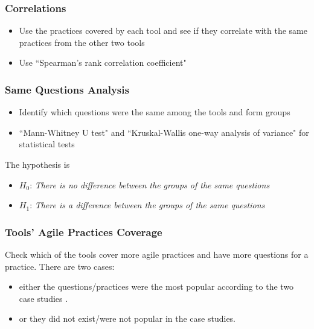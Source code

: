 \clearpage

%

\subsubsection{Correlations}

\begin{itemize}
	\item Use the practices covered by each tool and see if they correlate with the same practices from the other two tools
	\item Use ``Spearman's rank correlation coefficient"
\end{itemize}

\clearpage

\subsubsection{Same Questions Analysis}

\begin{itemize}
	\item Identify which questions were the same among the tools and form groups
	\item ``Mann-Whitney U test" and ``Kruskal-Wallis one-way analysis of variance" for statistical tests
\end{itemize}

The hypothesis is

\begin{itemize}[label={}]
	\item $H_0$: \textit{There is no difference between the groups of the same questions}
	\item $H_1$: \textit{There is a difference between the groups of the same questions}
\end{itemize}

\clearpage

\subsubsection{Tools' Agile Practices Coverage}

Check which of the tools cover more agile practices and have more questions for a practice. There are two cases:

\begin{itemize}
	\item either the questions/practices were the most popular according to the two case studies \cite{Williams_Microsoft, laurie_williams}.
	\item or they did not exist/were not popular in the case studies.
\end{itemize}

\clearpage